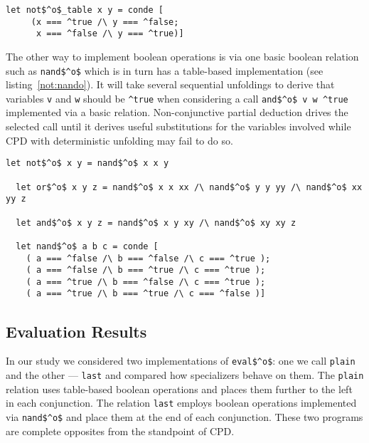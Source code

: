 \begin{figure*}[!h]
  \centering
  \begin{minipage}{0.45\textwidth}
    \begin{lstlisting}[label={not:table}, caption={Implementation of boolean \lstinline{not} as a table}, captionpos=b, frame=tb]
  let not$^o$_table x y = conde [
     (x === ^true /\ y === ^false;
      x === ^false /\ y === ^true)]
    \end{lstlisting}
  \end{minipage}
\end{figure*}

The other way to implement boolean operations is via one basic boolean relation such as \lstinline{nand$^o$} which is in turn has a table-based implementation (see listing~\ref{not:nando}).
It will take several sequential unfoldings to derive that variables \lstinline{v} and \lstinline{w} should be \lstinline{^true} when considering a call \lstinline{and$^o$ v w ^true} implemented via a basic relation.
Non-conjunctive partial deduction drives the selected call until it derives useful substitutions for the variables involved while CPD with deterministic unfolding may fail to do so.

\begin{figure*}[!h]
  \centering
  \begin{minipage}{0.7\textwidth}
    \begin{lstlisting}[label={not:nando}, caption={Implementation of boolean operation via \lstinline{nand}}, captionpos=b, frame=tb]
  let not$^o$ x y = nand$^o$ x x y

  let or$^o$ x y z = nand$^o$ x x xx /\ nand$^o$ y y yy /\ nand$^o$ xx yy z

  let and$^o$ x y z = nand$^o$ x y xy /\ nand$^o$ xy xy z

  let nand$^o$ a b c = conde [
    ( a === ^false /\ b === ^false /\ c === ^true );
    ( a === ^false /\ b === ^true /\ c === ^true );
    ( a === ^true /\ b === ^false /\ c === ^true );
    ( a === ^true /\ b === ^true /\ c === ^false )]
    \end{lstlisting}
  \end{minipage}
\end{figure*}

\subsection{Evaluation Results}

In our study we considered two implementations of \lstinline{eval$^o$}: one we call \lstinline{plain} and the other --- \lstinline{last} and compared how specializers behave on them.
The \lstinline{plain} relation uses table-based boolean operations and places them further to the left in each conjunction.
The relation \lstinline{last} employs boolean operations implemented via \lstinline{nand$^o$} and place them at the end of each conjunction.
These two programs are complete opposites from the standpoint of CPD.

